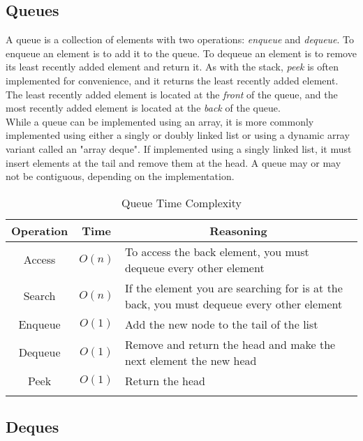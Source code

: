 
\subsection{Queues}

A queue is a collection of elements with  two operations: \textit{enqueue} and \textit{dequeue}. To enqueue an element is to add it to the queue. To dequeue an element is to remove its least recently added element and return it. As with the stack, \textit{peek} is often implemented for convenience, and it returns the least recently added element. The least recently added element is located at the \textit{front} of the queue, and the most recently added element is located at the \textit{back} of the queue. \\

While a queue can be implemented using an array, it is more commonly implemented using either a singly or doubly linked list or using a dynamic array variant called an "array deque". If implemented using a singly linked list, it must insert elements at the tail and remove them at the head. A queue may or may not be contiguous, depending on the implementation.

\begin{table}[H]
	\caption{Queue Time Complexity}
	\label{tab:queue}
	\begin{tabularx}{\textwidth}{|c|c|X|}
		\vtabularspace{3}
		\hline
		Operation & Time & \multicolumn{1}{c|}{Reasoning} \\
		\hline
		Access & $O(n)$ & To access the back element, you must dequeue every other element \\
		Search & $O(n)$ & If the element you are searching for is at the back, you must dequeue every other element  \\
		\hline
		\hline
		Enqueue & $O(1)$ & Add the new node to the tail of the list \\
		Dequeue & $O(1)$ & Remove and return the head and make the next element the new head \\
		Peek & $O(1)$ & Return the head \\
		\hline
		\vtabularspace{3}
	\end{tabularx}
\end{table}


\subsection{Deques}

